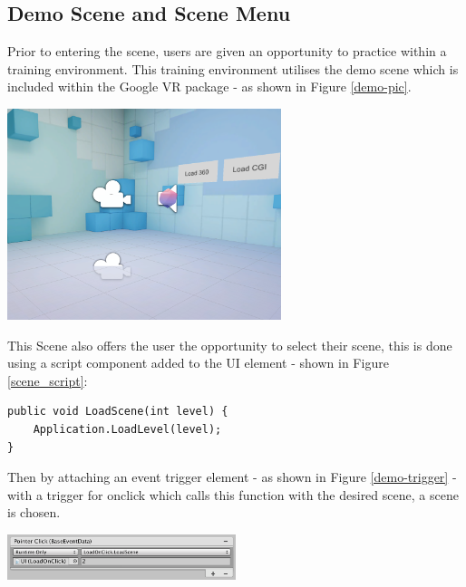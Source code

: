 \documentclass[ %
                    author={Elis Jones},
                supervisor={Dr. Kirsten Cater},
                    degree={BSc},
                     title={The Effect of Presentation Medium on Spatial Cognition},
                  subtitle={in the Virtual Environment},
                      year={2018} ]{dissertation}
\begin{document}
\subsection{Demo Scene and Scene Menu}\label{demo}
Prior to entering the scene, users are given an opportunity to practice within a training environment. This training environment utilises the demo scene which is included within the Google VR package - as shown in Figure \ref{demo-pic}.

\begin{minipage}{\textwidth}
\hfill \break
\centering
\includegraphics[width=0.6\textwidth]{images/demo-pic.png}
\label{demo-pic}
\hfill \break
\end{minipage}

This Scene also offers the user the opportunity to select their scene, this is done using a script component added to the UI element - shown in Figure \ref{scene_script}:

\begin{minipage}{\textwidth}
\begin{lstlisting}
public void LoadScene(int level) {
	Application.LoadLevel(level);
}
\end{lstlisting}
\label{scene_script}
\end{minipage}

Then by attaching an event trigger element - as shown in Figure \ref{demo-trigger} - with a trigger for onclick which calls this function with the desired scene, a scene is chosen.

\begin{minipage}{\textwidth}
\hfill \break
\centering
\includegraphics[width=0.5\textwidth]{images/demo-trigger.png}
\label{demo-trigger}
\hfill \break
\end{minipage}
\end{document}
